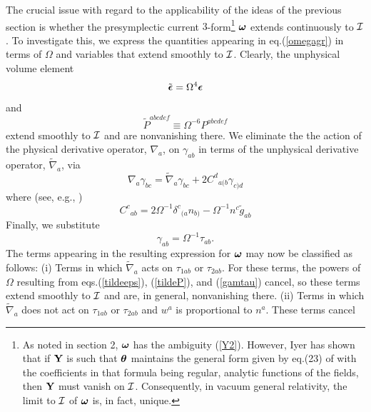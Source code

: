 The crucial issue with regard to the applicability of the ideas of the
previous section is whether the presymplectic current
$3$-form\footnote{As noted in section 2, ${\mbox{\boldmath $\omega$}}$
has the ambiguity (\ref{Y2}). However, Iyer \cite{i} has shown
that if ${\bf Y}$ is such that ${\mbox{\boldmath $\theta$}}$ maintains
the general form given by eq.(23) of \cite{iw} with the coefficients
in that formula being regular, analytic functions of the fields, then
${\bf Y}$ must vanish on ${\cal I}$. Consequently, in vacuum general
relativity, the limit to ${\cal I}$ of ${\mbox{\boldmath $\omega$}}$
is, in fact, unique.} ${\mbox{\boldmath $\omega$}}$ extends
continuously to ${\cal I}$. To investigate this, we express the
quantities appearing in eq.(\ref{omegagr}) in terms of $\Omega$ and
variables that extend smoothly to ${\cal I}$. Clearly, the unphysical
volume element
\begin{equation}
\tilde {\mbox{\boldmath $\epsilon$}} = \Omega^4 {\mbox{\boldmath $\epsilon$}}
\label{tildeeps}
\end{equation}
and
\begin{equation}
\tilde{P}^{abcdef} \equiv \Omega^{-6} P^{abcdef}
\label{tildeP}
\end{equation}
extend smoothly to ${\cal I}$ and are nonvanishing there. We eliminate
the the action of the physical derivative operator, $\nabla_a$, on
$\gamma_{ab}$ in terms of the unphysical derivative operator,
$\tilde{\nabla}_a$, via
\begin{equation}
\nabla_a \gamma_{bc} = \tilde{\nabla}_a \gamma_{bc} + 2 {C^d}_{a(b}
\gamma_{c)d}
\label{der}
\end{equation}
where (see, e.g., \cite{w})
\begin{equation}
{C^c}_{ab} = 2 \Omega^{-1} {\delta^c}_{(a} n_{b)} - \Omega^{-1} n^c
\tilde{g}_{ab}
\label{C}
\end{equation}
Finally, we substitute 
\begin{equation}
\gamma_{ab} = \Omega^{-1} \tau_{ab} .
\label{gamtau}
\end{equation}
The terms appearing in the resulting expression for ${\mbox{\boldmath
$\omega$}}$ may now be classified as follows: (i) Terms in which
$\tilde{\nabla}_a$ acts on $\tau_{1ab}$ or $\tau_{2ab}$. For these
terms, the powers of $\Omega$ resulting from eqs.(\ref{tildeeps}),
(\ref{tildeP}), and (\ref{gamtau}) cancel, so these terms extend
smoothly to ${\cal I}$ and are, in general, nonvanishing there. (ii)
Terms in which $\tilde{\nabla}_a$ does not act on $\tau_{1ab}$ or
$\tau_{2ab}$ and $w^a$ is proportional to $n^a$. These terms cancel

